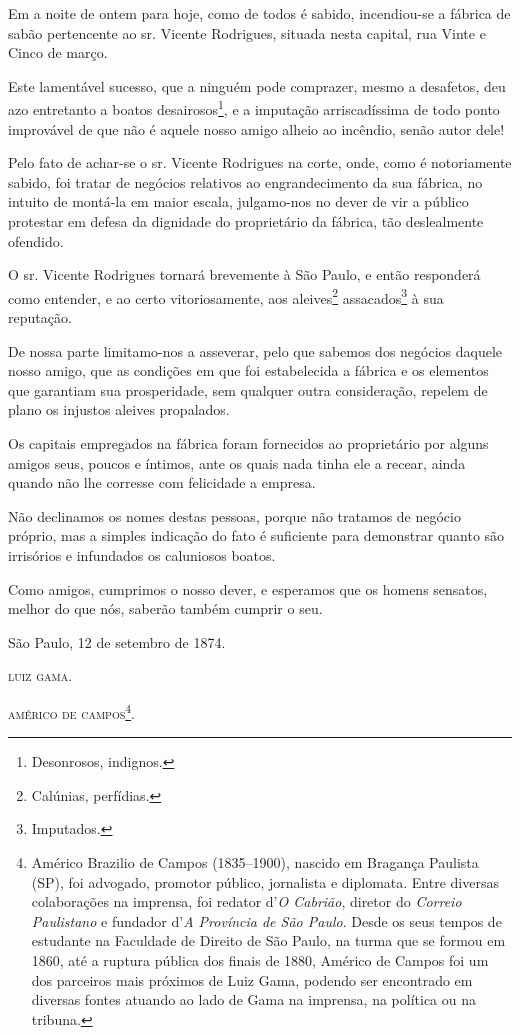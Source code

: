\asterisc{}

Em a noite de ontem para hoje, como de todos é sabido, incendiou-se a
fábrica de sabão pertencente ao sr. Vicente Rodrigues, situada nesta
capital, rua Vinte e Cinco de março.

Este lamentável sucesso, que a ninguém pode comprazer, mesmo a
desafetos, deu azo entretanto a boatos desairosos\footnote{ Desonrosos,
  indignos.}, e a imputação arriscadíssima de todo ponto improvável de
que não é aquele nosso amigo alheio ao incêndio, senão autor dele!

Pelo fato de achar-se o sr. Vicente Rodrigues na corte, onde, como é
notoriamente sabido, foi tratar de negócios relativos ao engrandecimento
da sua fábrica, no intuito de montá-la em maior escala, julgamo-nos no
dever de vir a público protestar em defesa da dignidade do proprietário
da fábrica, tão deslealmente ofendido.

O sr. Vicente Rodrigues tornará brevemente à São Paulo, e então
responderá como entender, e ao certo vitoriosamente, aos
aleives\footnote{ Calúnias, perfídias.} assacados\footnote{ Imputados.}
à sua reputação.

De nossa parte limitamo-nos a asseverar, pelo que sabemos dos negócios
daquele nosso amigo, que as condições em que foi estabelecida a fábrica
e os elementos que garantiam sua prosperidade, sem qualquer outra
consideração, repelem de plano os injustos aleives propalados.

Os capitais empregados na fábrica foram fornecidos ao proprietário por
alguns amigos seus, poucos e íntimos, ante os quais nada tinha ele a
recear, ainda quando não lhe corresse com felicidade a empresa.

Não declinamos os nomes destas pessoas, porque não tratamos de negócio
próprio, mas a simples indicação do fato é suficiente para demonstrar
quanto são irrisórios e infundados os caluniosos boatos.

Como amigos, cumprimos o nosso dever, e esperamos que os homens
sensatos, melhor do que nós, saberão também cumprir o seu.
\begin{flushright}
São Paulo, 12 de setembro de 1874.

\textsc{luiz gama}.
\end{flushright}

\textsc{américo de campos}\footnote{ Américo Brazilio de Campos (1835--1900),
  nascido em Bragança Paulista (SP), foi advogado, promotor público,
  jornalista e diplomata. Entre diversas colaborações na imprensa, foi
  redator d'\emph{O Cabrião}, diretor do \emph{Correio Paulistano} e
  fundador d'\emph{A Província de São Paulo}. Desde os seus tempos de
  estudante na Faculdade de Direito de São Paulo, na turma que se formou
  em 1860, até a ruptura pública dos finais de 1880, Américo de Campos
  foi um dos parceiros mais próximos de Luiz Gama, podendo ser
  encontrado em diversas fontes atuando ao lado de Gama na imprensa, na
  política ou na tribuna.}.

